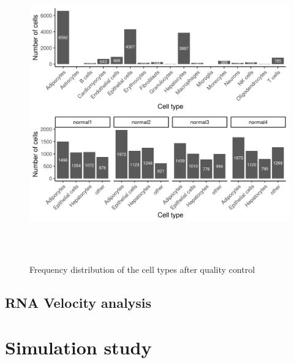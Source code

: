 \begin{figure}[!htb]
\begin{center}
\includegraphics[width=6in,height=5in]{figure/kidney_mouse/cell_type_distribution.png}
\end{center}
\caption{Frequency distribution of the cell types after quality control} 
\label{fig:mouse_cell_type}
\end{figure}
\FloatBarrier

\subsection{RNA Velocity analysis}

\section{Simulation study}

